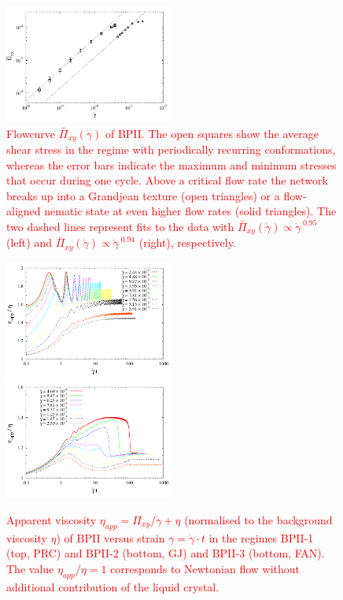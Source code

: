 \documentclass[8.5pt,twoside,twocolumn]{article}
\newcommand{\gd}{\dot{\gamma}}
\newcommand{\rev}[1]{{\textcolor{red}{#1}}}
\begin{document}
\begin{figure}[htpb]
\includegraphics[width=0.495\textwidth]{flowcurve_bp2.pdf}
\caption{\rev{Flowcurve $\bar{\Pi}_{xy}(\gd)$ of BPII. The open squares show the average shear stress in the regime with periodically recurring conformations,
whereas the error bars indicate the maximum and minimum stresses that occur during one cycle. Above a critical flow rate the network  
breaks up into a Grandjean texture (open triangles) or a flow-aligned nematic state at even higher flow rates (solid triangles).
The two dashed lines represent fits to the data with $\bar{\Pi}_{xy}(\gd)\propto \gd^{\;0.95}$ (left) and $\bar{\Pi}_{xy}(\gd)\propto \gd^{\;0.94}$ (right), respectively.}}
\label{bp2-flowcurve}
\end{figure}

\begin{figure}[htpb]
\includegraphics[width=0.495\textwidth]{app_visc_strain_bp2_a.pdf}\\
\includegraphics[width=0.495\textwidth]{app_visc_strain_bp2_b.pdf}\\
\caption{\rev{Apparent viscosity $\eta_{app}=\Pi_{xy}/\gd + \eta$ (normalised to the background viscosity $\eta$) 
of BPII versus strain $\gamma = \gd\cdot t$ in the regimes BPII-1 (top, PRC) and BPII-2 (bottom, GJ) and BPII-3 (bottom, FAN). 
The value $\eta_{app}/\eta=1$ corresponds to Newtonian flow without additional contribution of the liquid crystal.}} 
\label{bp2-appvisc}
\end{figure}
\end{document}
